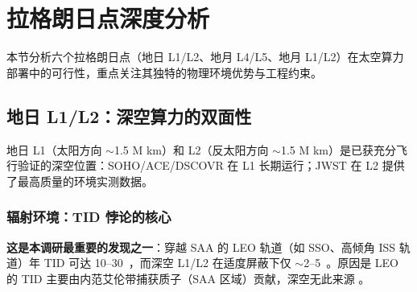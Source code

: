 
\section{拉格朗日点深度分析}

本节分析六个拉格朗日点（地日 L1/L2、地月 L4/L5、地月 L1/L2）在太空算力部署中的可行性，重点关注其独特的物理环境优势与工程约束。

\subsection{地日 L1/L2：深空算力的双面性}

地日 L1（太阳方向 $\sim$1.5 M km）和 L2（反太阳方向 $\sim$1.5 M km）是已获充分飞行验证的深空位置：SOHO/ACE/DSCOVR 在 L1 长期运行；JWST 在 L2 提供了最高质量的环境实测数据。

\subsubsection{辐射环境：TID 悖论的核心}

\begin{table}[H]
\centering
\caption{地日 L1/L2 辐射环境 vs LEO}
\label{tab:l1l2-rad}
\end{table}

\textbf{这是本调研最重要的发现之一}：穿越 SAA 的 LEO 轨道（如 SSO、高倾角 ISS 轨道）年 TID 可达 10--30~\kradyr，而深空 L1/L2 在适度屏蔽下仅 $\sim$2--5~\kradyr。原因是 LEO 的 TID 主要由内范艾伦带捕获质子（SAA 区域）贡献，深空无此来源 \cite{nasa_photonics_mars_2014}。

